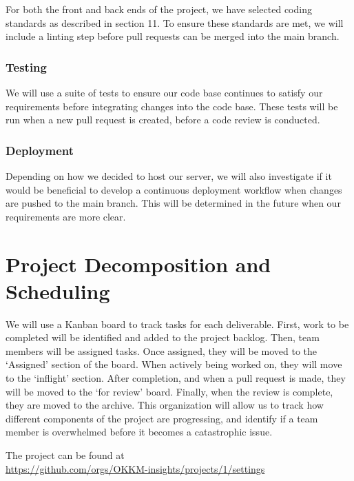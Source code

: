 \documentclass{article}
\begin{document}
 For both the front and back ends of the project, we have selected coding standards as described in section 11. To ensure these standards are met, we will include
 a linting step before pull requests can be merged into the main branch.

\subsubsection{Testing}
We will use a suite of tests to ensure our code base continues to satisfy our requirements before integrating changes into the code base. These tests
will be run when a new pull request is created, before a code review is conducted.

\subsubsection{Deployment}
Depending on how we decided to host our server, we will also investigate if it would be beneficial to develop a continuous deployment workflow when changes are 
pushed to the main branch. This will be determined in the future when our requirements are more clear.
\section{Project Decomposition and Scheduling}


We will use a Kanban board to track tasks for each deliverable. First, work to be completed will be identified and added to the project backlog.
Then, team members will be assigned tasks. Once assigned, they will be moved to the `Assigned' section of the board. When actively being worked on, they will
move to the `inflight' section. After completion, and when a pull request is made, they will be moved to the `for review' board. Finally, when the review is
complete, they are moved to the archive. This organization will allow us to track how different components of the project are progressing, and identify
if a team member is overwhelmed before it becomes a catastrophic issue.

The project can be found at \\\url{https://github.com/orgs/OKKM-insights/projects/1/settings}
\end{document}
